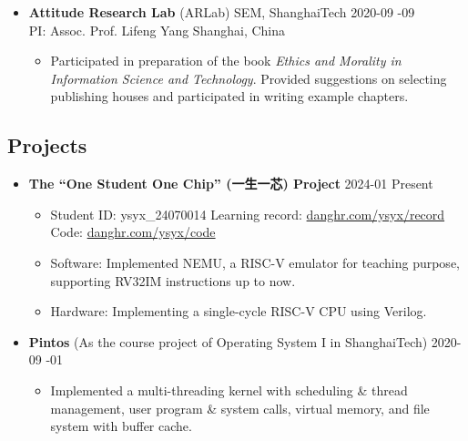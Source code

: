 \documentclass[a4paper,10pt]{ctexart} %
\begin{document}
\begin{keepsection}
\begin{itemize}
    \item \textbf{Attitude Research Lab} (ARLab) \quad SEM, ShanghaiTech \hfill 2020-09 -09 \\
    {\small PI: Assoc. Prof. Lifeng Yang} \hfill Shanghai, China
    \begin{small}
        \begin{itemize}
            \item Participated in preparation of the book \textit{Ethics and Morality in Information Science and Technology}. Provided suggestions on selecting publishing houses and participated in writing example chapters.
        \end{itemize}
    \end{small}
\end{itemize}
\end{keepsection}

\begin{keepsection}
\subsection{Projects}
\begin{itemize}
    \item \textbf{The ``One Student One Chip'' (一生一芯) Project} \hfill 2024-01 \datetlide Present
    \begin{small}
        \begin{itemize}
            \item Student ID: ysyx\_24070014 \quad Learning record: \href{https://www.danghr.com/ysyx/record}{danghr.com/ysyx/record} \quad Code: \href{https://www.danghr.com/ysyx/code}{danghr.com/ysyx/code}
            \item Software: Implemented NEMU, a RISC-V emulator for teaching purpose, supporting RV32IM instructions up to now.
            \item Hardware: Implementing a single-cycle RISC-V CPU using Verilog.
        \end{itemize}
    \end{small}
    \item \textbf{Pintos} {\small (As the course project of Operating System I in ShanghaiTech)} \hfill 2020-09 -01
    \begin{small}
        \begin{itemize}
            \item Implemented a multi-threading kernel with scheduling \& thread management, user program \& system calls, virtual memory, and file system with buffer cache.
        \end{itemize}
    \end{small}
\end{itemize}
\end{keepsection}
\end{document}
